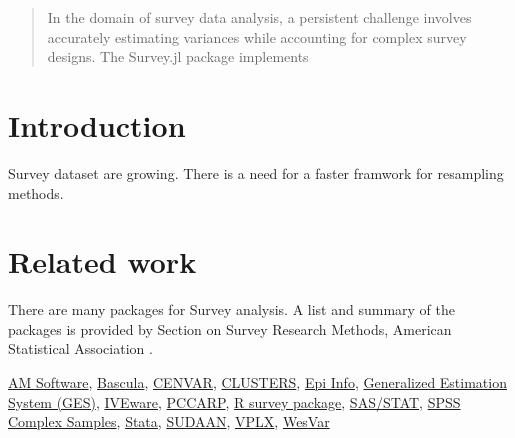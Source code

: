 \documentclass{juliacon}
\begin{document}


\maketitle

\begin{abstract}

In the domain of survey data analysis, a persistent challenge involves accurately estimating variances while accounting for complex survey designs. The Survey.jl package implements 

\end{abstract}

\section{Introduction}

Survey dataset are growing. There is a need for a faster framwork for resampling methods. 


\section{Related work}


There are many packages for Survey analysis. A list and summary of the packages is provided by Section on Survey Research Methods, American Statistical Association \cite{SummarySurveyAnalysis}. 

\href{https://www.hcp.med.harvard.edu/statistics/survey-soft/am.html}{AM Software}, 
\href{https://www.hcp.med.harvard.edu/statistics/survey-soft/bascula.html}{Bascula}, 
\href{https://www.hcp.med.harvard.edu/statistics/survey-soft/cenvar.html}{CENVAR}, 
\href{https://www.hcp.med.harvard.edu/statistics/survey-soft/clusters.html}{CLUSTERS},  
\href{https://www.cdc.gov/epiinfo/index.html}{Epi Info},  
\href{https://www.statcan.gc.ca/eng/survey/methodology/Generalized_Estimation_System-eng.htm}{Generalized Estimation System (GES)},  
\href{https://isr.umich.edu/}{IVEware},  
\href{https://catalog.iastate.edu/azcourses/stat/}{PCCARP},  
\href{https://cran.r-project.org/package=survey}{R survey package}, 
\href{https://www.sas.com/en_us/home.html}{SAS/STAT},  
\href{https://www.ibm.com/products/spss-statistics}{SPSS Complex Samples},  
\href{https://www.stata.com/}{Stata},  
\href{https://sudaanorder.rti.org/}{SUDAAN},  
\href{https://www.census.gov/data/software/vplx.html}{VPLX},  
\href{https://www.westat.com/wesvar/}{WesVar}
\end{document}
